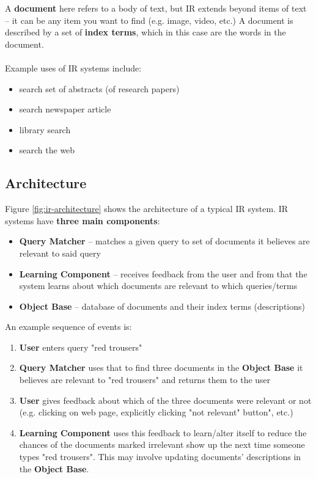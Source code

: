 \documentclass{article}
\begin{document}
A \textbf{document} here refers to a body of text, but IR extends beyond items of text -- it can be any item you want to find (e.g. image, video, etc.) A document is described by a set of \textbf{index terms}, which in this case are the words in the document. 

\paragraph{}

Example uses of IR systems include:
\begin{itemize}
	\item search set of abstracts (of research papers)
	\item search newspaper article
	\item library search
	\item search the web
\end{itemize}

\subsection{Architecture}

Figure \ref{fig:ir-architecture} shows the architecture of a typical IR system. IR systems have \textbf{three main components}:
\begin{itemize}
	\item \textbf{Query Matcher} -- matches a given query to set of documents it believes are relevant to said query
	\item \textbf{Learning Component} -- receives feedback from the user and from that the system learns about which documents are relevant to which queries/terms
	\item \textbf{Object Base} -- database of documents and their index terms (descriptions)
\end{itemize}

An example sequence of events is:
\begin{enumerate}
	\item \textbf{User} enters query "red trousers"
	\item \textbf{Query Matcher} uses that to find three documents in the \textbf{Object Base} it believes are relevant to "red trousers" and returns them to the user
	\item \textbf{User} gives feedback about which of the three documents were relevant or not (e.g. clicking on web page, explicitly clicking "not relevant" button", etc.)
	\item \textbf{Learning Component} uses this feedback to learn/alter itself to reduce the chances of the documents marked irrelevant show up the next time someone types "red trousers". This may involve updating documents' descriptions in the \textbf{Object Base}.
\end{enumerate}
\end{document}
